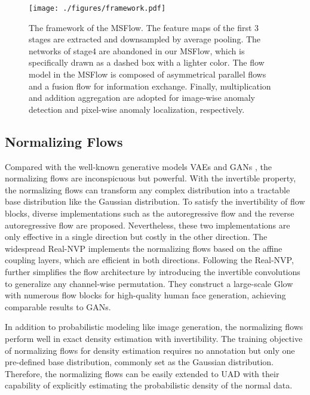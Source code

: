 \documentclass[lettersize,journal]{IEEEtran}
\begin{document}
\begin{figure*}[t]
  \centering
  \texttt{[image: ./figures/framework.pdf]}
  \caption{The framework of the MSFlow. The feature maps of the first 3 stages are extracted and  downsampled by average pooling. The networks of stage4 are abandoned in our MSFlow, which is specifically drawn as a dashed box with a lighter color. The flow model in the MSFlow is composed of asymmetrical parallel flows and a fusion flow for information exchange. Finally, multiplication and addition aggregation are adopted for image-wise anomaly detection and pixel-wise anomaly localization, respectively.}
  \label{fig:framework}
\end{figure*}


\subsection{Normalizing Flows}
Compared with the well-known generative models VAEs \cite{kingma2013vaes} and GANs \cite{goodfellow2014gans}, the normalizing flows are inconspicuous but powerful. With the invertible property, the normalizing flows can transform any complex distribution into a tractable base distribution like the Gaussian distribution. To satisfy the invertibility of flow blocks, diverse implementations such as the autoregressive flow \cite{germain2015made} and the reverse autoregressive flow \cite{kingma2016improved} are proposed. Nevertheless, these two implementations are only effective in a single direction but costly in the other direction. The widespread Real-NVP \cite{dinh2016realnvp} implements the normalizing flows based on the affine coupling layers, which are efficient in both directions. Following the Real-NVP, \cite{kingma2018glow} further simplifies the flow architecture by introducing the invertible  convolutions to generalize any channel-wise permutation. They construct a large-scale Glow with numerous flow blocks for high-quality human face generation, achieving comparable results to GANs.

In addition to probabilistic modeling like image generation, the normalizing flows perform well in exact density estimation \cite{germain2015made,dinh2016realnvp} with invertibility. The training objective of normalizing flows for density estimation requires no annotation but only one pre-defined base distribution, commonly set as the Gaussian distribution. Therefore, the normalizing flows can be easily extended to UAD with their capability of explicitly estimating the probabilistic density of the normal data.
\end{document}
